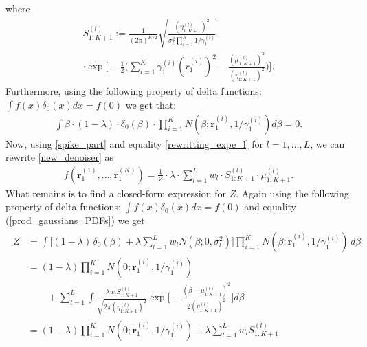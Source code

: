 where 
\begin{multline}
    S_{1:K+1}^{(l)} := \frac{1}{(2\pi)^{K/2}} \sqrt{\frac{(\eta^{(l)}_{1:K+1})^2}{\sigma_l^2 \prod_{i=1}^K 1/\gamma_1^{(i)}}} \\
    \cdot \exp \bigg [ -\frac{1}{2} \bigg ( \sum_{i=1}^{K} \gamma_1^{(i)} (r_1^{(i)})^2 - \frac{(\mu^{(l)}_{1:K+1})^2}{(\eta^{(l)}_{1:K+1})^2} \bigg ) \bigg ].
\end{multline}
Furthermore, using the following property of delta functions: $\int f(x) \delta_0(x) dx = f(0)$ we get that:
\begin{align}
    \label{spike_part}
    \int \beta \cdot (1-\lambda) \cdot \delta_0(\beta) \cdot \prod_{i=1}^K N(\beta; \textbf{r}_1^{(i)}, 1/\gamma_{1}^{(i)} ) d \beta = 0.
\end{align}
Now, using \eqref{spike_part} and equality \eqref{rewritting_expe_l} for $l=1,\dots, L$, we can rewrite \eqref{new_denoiser} as
\begin{align}
    \label{step_final}
     f(\textbf{r}_1^{(1)}, \dots, \textbf{r}_1^{(K)}) = \frac{1}{Z} \cdot \lambda \cdot \sum_{l=1}^L w_l \cdot S_{1:K+1}^{(l)}\cdot \mu_{1:K+1}^{(l)}.
\end{align}
What remains is to find a closed-form expression for $Z$. Again using the following property of delta functions: $\int f(x) \delta_0(x) dx = f(0)$ and equality (\ref{prod_gaussians_PDFs}) we get
\begin{align}
    \label{constZ}
    \begin{split}
    Z & = \int \bigg[ (1-\lambda) \, \delta_0(\beta) + \lambda \sum_{l=1}^L w_l N(\beta; 0, \sigma_l^2) \bigg] \prod_{i=1}^K N(\beta; \textbf{r}_1^{(i)}, 1/\gamma_{1}^{(i)}) \, d \beta \\
    & = (1-\lambda) \prod_{i=1}^K N(0; \textbf{r}_1^{(i)}, 1/\gamma_{1}^{(i)}) \\
    & \qquad + \sum_{l=1}^L \int \frac{\lambda w_l S_{1:K+1}^{(l)}}{\sqrt{2 \pi (\eta_{1:K+1}^{(l)})^2}} \exp \bigg[ -\frac{(\beta - \mu_{1:K+1}^{(l)})^2}{2 (\eta_{1:K+1}^{(l)})^2} \bigg] d \beta \\
    & = (1-\lambda) \prod_{i=1}^K N(0; \textbf{r}_1^{(i)}, 1/\gamma_{1}^{(i)}) + \lambda \sum_{l=1}^L w_l S_{1:K+1}^{(l)}.
    \end{split}
\end{align}

